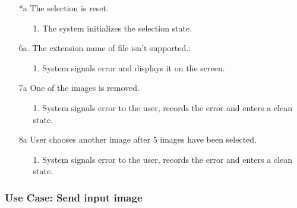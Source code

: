 \documentclass[parskip=full]{scrartcl}
\begin{document}
\begin{enumerate}
	\begin{itemize} [nosep]
		\item[*a] The selection is reset.
			\begin{itemize} [nosep]
				\item[1.] The system initializes the selection state.
			\end{itemize}
		\item[6a.] The extension name of file isn't supported.:
		\begin{itemize} [nosep]
			\item[1.] System signals error and displays it on the screen.
		\end{itemize}
		\item[7a] One of the images is removed.
		\begin{itemize} [nosep]
			\item[1.] System signals error to the user, records the error and enters a clean state.
		\end{itemize}		
		\item[8a] User chooses another image after 5 images have been selected.
		\begin{itemize} [nosep]
			\item[1.] System signals error to the user, records the error and enters a clean state.
		\end{itemize}		
	\end{itemize}
\end{enumerate}

\pagebreak


\subsubsection {Use Case: Send input image} \label {uc:sip}
\end{document}

